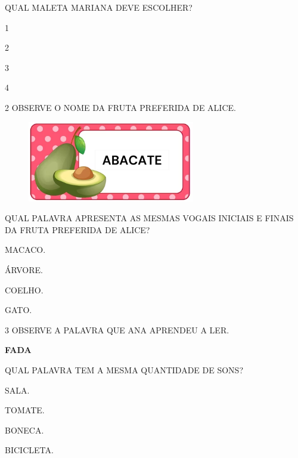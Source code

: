 QUAL MALETA MARIANA DEVE ESCOLHER?

\begin{escolha}
\item 1

\item 2

\item 3

\item 4
\end{escolha}

\num{2} OBSERVE O NOME DA FRUTA PREFERIDA DE ALICE.

\begin{figure}[htpb!]
\centering
\includegraphics[width=.45\textwidth]{media/image212.png}
\end{figure}

\pagebreak
QUAL PALAVRA APRESENTA AS MESMAS VOGAIS INICIAIS E FINAIS DA FRUTA PREFERIDA DE ALICE?

\begin{escolha}
\item MACACO.

\item ÁRVORE.

\item COELHO.

\item GATO.
\end{escolha}


\num{3} OBSERVE A PALAVRA QUE ANA APRENDEU A LER.

\begin{myquote}
\textbf{FADA}
\end{myquote}

QUAL PALAVRA TEM A MESMA QUANTIDADE DE SONS?

\begin{escolha}
\item SALA.

\item TOMATE.

\item BONECA.

\item BICICLETA.
\end{escolha}


